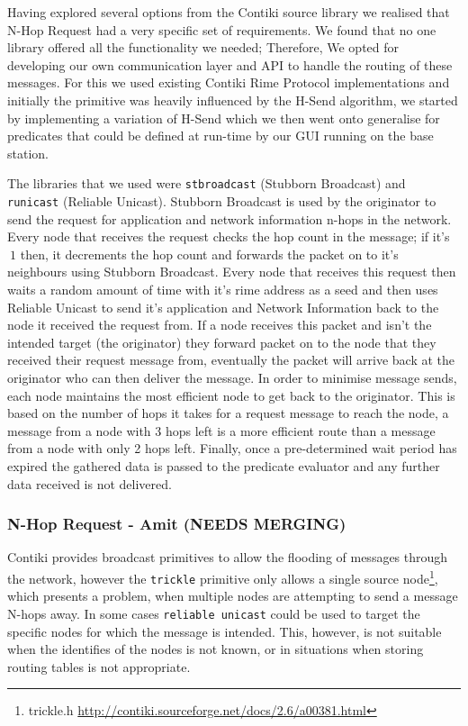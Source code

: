 Having explored several options from the Contiki source library we realised that N-Hop Request had a very specific set of requirements. We found that no one library offered all the functionality we needed; Therefore, We opted for developing our own communication layer and API to handle the routing of these messages. For this we used existing Contiki Rime Protocol implementations and initially the primitive was heavily influenced by the H-Send\cite{HSEND} algorithm, we started by implementing a variation of H-Send which we then went onto generalise for predicates that could be defined at run-time by our GUI running on the base station.

The libraries that we used were \verb|stbroadcast| (Stubborn Broadcast) and \verb|runicast| (Reliable Unicast). Stubborn Broadcast is used by the originator to send the request for application and network information n-hops in the network. Every node that receives the request checks the hop count in the message; if it's $\> 1$ then, it decrements the hop count and forwards the packet on to it's neighbours using Stubborn Broadcast. Every node that receives this request then waits a random amount of time with it's rime address as a seed and then uses Reliable Unicast to send it's application and Network Information back to the node it received the request from. If a node receives this packet and isn't the intended target (the originator) they forward packet on to the node that they received their request message from, eventually the packet will arrive back at the originator who can then deliver the message. In order to minimise message sends, each node maintains the most efficient node to get back to the originator. This is based on the number of hops it takes for a request message to reach the node, a message from a node with 3 hops left is a more efficient route than a message from a node with only 2 hops left. Finally, once a pre-determined wait period has expired the gathered data is passed to the predicate evaluator and any further data received is not delivered.

\subsubsection{N-Hop Request - Amit (NEEDS MERGING)}
Contiki provides broadcast primitives to allow the flooding of messages through the network, however the \verb|trickle|\cite{Levis04trickle} primitive only allows a single source node\footnote{trickle.h \url{http://contiki.sourceforge.net/docs/2.6/a00381.html}}, which presents a problem, when multiple nodes are attempting to send a message N-hops away. 
In some cases \verb|reliable unicast| could be used to target the specific nodes for which the message is intended. This, however, is not suitable when the identifies of the nodes is not known, or in situations when storing routing tables is not appropriate. 

